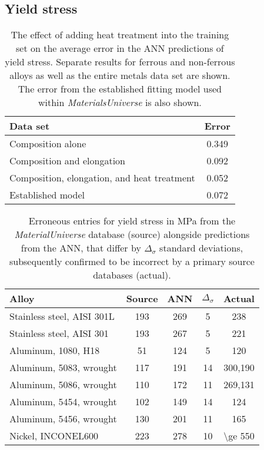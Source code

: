\documentclass[review]{elsarticle}
\begin{document}
\subsection{Yield stress}

\begin{table}
  \caption{The effect of adding heat treatment into the training set on the 
    average error in the ANN predictions of yield stress. Separate results for
    ferrous and non-ferrous alloys as well as the entire metals data set are shown.
    The error from the established fitting model used within
    \textit{MaterialsUniverse} is also shown.}
\begin{tabular}{lc}
  \bf{Data set}&
  \bf{Error}\\
  \hline
  Composition alone&\num{0.349}\\
  Composition and elongation&\num{0.092}\\
  Composition, elongation, and heat treatment&\num{0.052} \\
  Established model&\num{0.072}
\end{tabular}
 \label{tab:4-04-yield-stress-2}
\end{table}

\begin{table}
  \caption{Erroneous entries for yield stress in \si{\mega\pascal}
    from the \textit{MaterialUniverse} database (source) alongside
    predictions from the ANN, that differ by $\Delta_{\sigma}$
    standard deviations, subsequently confirmed
    to be incorrect by a primary source databases (actual).}
\begin{tabular}{lcccc}
  \bf{Alloy}&
  \bf{Source}& 
  \bf{ANN}&
  $\Delta_\sigma$& 
  \bf{Actual}\\
  \hline
  Stainless steel, AISI 301L& 
  \num{193}&\num{269}&\num{5}&\num{238}\cite{AZOMaterials}\\
  Stainless steel, AISI 301& 
  \num{193}&\num{267}&\num{5}&\num{221}\cite{AZOMaterials}\\
  Aluminum, 1080, H18& 
  \num{51} &\num{124}&\num{5}&\num{120}\cite{AZOMaterials}\\
  Aluminum, 5083, wrought& 
  \num{117}&\num{191}&\num{14}&\num{300},\num{190}\cite{MatWeb,AZOMaterials}\\
  Aluminum, 5086, wrought& 
  \num{110}&\num{172}&\num{11}&\num{269},\num{131}\cite{MatWeb,AZOMaterials}\\
  Aluminum, 5454, wrought& 
  \num{102}&\num{149}&\num{14}&\num{124}\cite{AZOMaterials}\\
  Aluminum, 5456, wrought& 
  \num{130}&\num{201}&\num{11}&\num{165}\cite{AZOMaterials}\\
  Nickel, INCONEL600& 
  \num{223}&\num{278}&\num{10}&\num{\ge 550}\cite{AZOMaterials}
\end{tabular}
 \label{tab:4-05-yield-stress-3}
\end{table}
\end{document}

